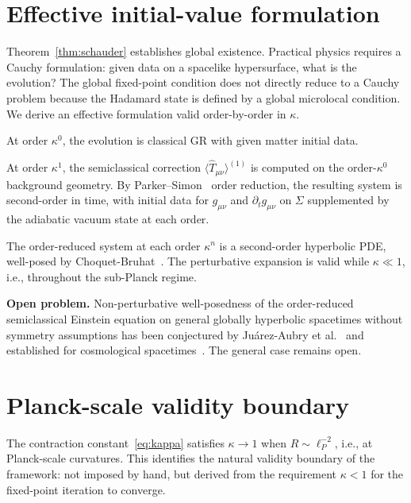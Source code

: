 \documentclass[12pt,a4paper]{article}
\begin{document}
\section{Effective initial-value formulation}
\label{sec:ivp}

Theorem~\ref{thm:schauder} establishes global existence. Practical physics requires a
Cauchy formulation: given data on a spacelike hypersurface, what is the evolution? The
global fixed-point condition does not directly reduce to a Cauchy problem because the
Hadamard state is defined by a global microlocal condition. We derive an effective
formulation valid order-by-order in $\kappa$.

At order $\kappa^0$, the evolution is classical GR with given matter initial data.

At order $\kappa^1$, the semiclassical correction $\langle\hat{T}_{\mu\nu}\rangle^{(1)}$
is computed on the order-$\kappa^0$ background geometry. By Parker--Simon~\cite{parker_simon}
order reduction, the resulting system is second-order in time, with initial data for
$g_{\mu\nu}$ and $\partial_t g_{\mu\nu}$ on $\Sigma$ supplemented by the adiabatic vacuum
state at each order.

The order-reduced system at each order $\kappa^n$ is a second-order hyperbolic PDE,
well-posed by Choquet-Bruhat~\cite{choquet_bruhat}. The perturbative expansion is valid
while $\kappa \ll 1$, i.e., throughout the sub-Planck regime.

\noindent\textbf{Open problem.} Non-perturbative well-posedness of the order-reduced
semiclassical Einstein equation on general globally hyperbolic spacetimes without symmetry
assumptions has been conjectured by Ju\'arez-Aubry et al.~\cite{juarez_aubry} and
established for cosmological spacetimes~\cite{pinamonti_siemssen}. The general case
remains open.

\section{Planck-scale validity boundary}
\label{sec:planck}

The contraction constant~\eqref{eq:kappa} satisfies $\kappa \to 1$ when
$R \sim \ell_P^{-2}$, i.e., at Planck-scale curvatures. This identifies the natural
validity boundary of the framework: not imposed by hand, but derived from the requirement
$\kappa < 1$ for the fixed-point iteration to converge.
\end{document}
